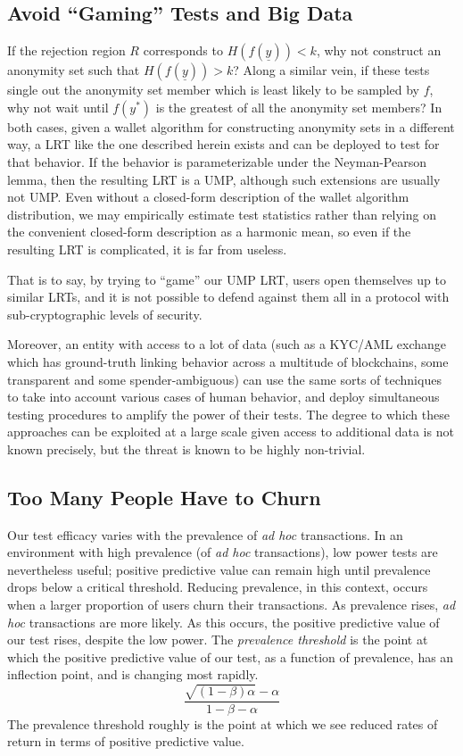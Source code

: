 \documentclass{tran-l}
\theoremstyle{cor}
\theoremstyle{definition}
\theoremstyle{remark}
\theoremstyle{conjecture}
\numberwithin{equation}{section}
\begin{document}
\subsection{Avoid ``Gaming'' Tests and Big Data}

If the rejection region $R$ corresponds to $H(f(\underline{y})) < k$, why not construct an anonymity set such that $H(f(\underline{y})) > k$?
Along a similar vein, if these tests single out the anonymity set member which is least likely to be sampled by $f$, why not wait until $f(y^*)$ is the greatest of all the anonymity set members?
In both cases, given a wallet algorithm for constructing anonymity sets in a different way, a LRT like the one described herein exists and can be deployed to test for that behavior.
If the behavior is parameterizable under the Neyman-Pearson lemma, then the resulting LRT is a UMP, although such extensions are usually not UMP.
Even without a closed-form description of the wallet algorithm distribution, we may empirically estimate test statistics rather than relying on the convenient closed-form description as a harmonic mean, so even if the resulting LRT is complicated, it is far from useless.

That is to say, by trying to ``game'' our UMP LRT, users open themselves up to similar LRTs, and it is not possible to defend against them all in a protocol with sub-cryptographic levels of security.

Moreover, an entity with access to a lot of data (such as a KYC/AML exchange which has ground-truth linking behavior across a multitude of blockchains, some transparent and some spender-ambiguous) can use the same sorts of techniques to take into account various cases of human behavior, and deploy simultaneous testing procedures to amplify the power of their tests.
The degree to which these approaches can be exploited at a large scale given access to additional data is not known precisely, but the threat is known to be highly non-trivial.


\subsection{Too Many People Have to Churn}

Our test efficacy varies with the prevalence of \textit{ad hoc} transactions.
In an environment with high prevalence (of \textit{ad hoc} transactions), low power tests are nevertheless useful; positive predictive value can remain high until prevalence drops below a critical threshold.
Reducing prevalence, in this context, occurs when a larger proportion of users churn their transactions.
As prevalence rises, \textit{ad hoc} transactions are more likely.
As this occurs, the positive predictive value of our test rises, despite the low power.
The \textit{prevalence threshold} is the point at which the positive predictive value of our test, as a function of prevalence, has an inflection point, and is changing most rapidly.
\[\frac{\sqrt{(1-\beta)\alpha} - \alpha}{1-\beta-\alpha}\]
The prevalence threshold roughly is the point at which we see reduced rates of return in terms of positive predictive value.
\end{document}
